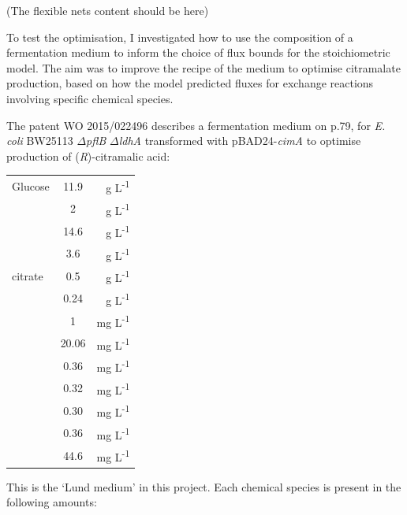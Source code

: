 \documentclass[a4paper, 12pt]{scrartcl}
\begin{document}
{(The flexible nets content should be here)

To test the optimisation, I investigated how to use the composition of a fermentation medium to inform the choice of flux bounds for the stoichiometric model. The aim was to improve the recipe of the medium to optimise citramalate production, based on how the model predicted fluxes for exchange reactions involving specific chemical species.

The patent WO 2015/022496 \citep{eastham_process_2015} describes a fermentation medium on p.79, for \emph{E. coli} BW25113 $\Delta$\emph{pflB} $\Delta$\emph{ldhA} transformed with pBAD24-\emph{cimA} to optimise production of (\emph{R})-citramalic acid:

\begin{center}
\begin{tabular}{lSr}
  Glucose & 11.9 & g L\textsuperscript{-1}\\
   & 2 & g L\textsuperscript{-1}\\
   & 14.6 & g L\textsuperscript{-1}\\
   & 3.6 & g L\textsuperscript{-1}\\
   citrate & 0.5 & g L\textsuperscript{-1}\\
   & 0.24 & g L\textsuperscript{-1}\\
   & 1 & mg L\textsuperscript{-1}\\
   & 20.06 & mg L\textsuperscript{-1}\\
   & 0.36 & mg L\textsuperscript{-1}\\
   & 0.32 & mg L\textsuperscript{-1}\\
   & 0.30 & mg L\textsuperscript{-1}\\
   & 0.36 & mg L\textsuperscript{-1}\\
   & 44.6 & mg L\textsuperscript{-1}                             
\end{tabular}
\end{center}

This is the `Lund medium' in this project.  Each chemical species is present in the following amounts:

}
\end{document}

